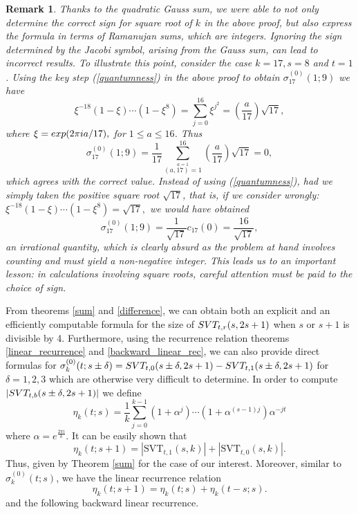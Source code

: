 \documentclass[12pt]{article}
\newtheorem{rema}{Remark}[subsection]%
\begin{document}
\begin{rema}
Thanks to the quadratic Gauss sum, we were able to not only determine the correct sign for square root of $k$ in the above proof, but also express the formula in terms of Ramanujan sums, which are integers.  Ignoring the sign determined by the Jacobi symbol, arising from the Gauss sum, can lead to incorrect results. To illustrate this point, consider the case $k = 17, s = 8$ and $t=1$. Using the key step (\ref{quantumness}) in the above proof to obtain $\sigma_{17}^{(0)}(1;9)$ we have 
$$
\xi^{-18}(1-\xi)\cdots (1-\xi^{8})=\sum_{j=0}^{16} \xi^{j^2}=\left(\frac{a}{17}\right)\sqrt{17},
$$
where $\xi=\textnormal{exp}(2\pi i a /17),$ for $1\leq a\leq 16$. Thus  
$$
\sigma_{17}^{(0)}(1;9)=\frac{1}{17}\sum_{\stackrel{a=1}{(a,17)=1}}^{16} \left(\frac{a}{17}\right)\sqrt{17}=0,
$$
which agrees with the correct value. Instead of using (\ref{quantumness}), had we simply taken the positive square root $\sqrt{17}$, that is, if we consider wrongly: $
\xi^{-18}(1-\xi)\cdots (1-\xi^{8})=\sqrt{17},
$
we would have obtained
\begin{equation}
\sigma_{17}^{(0)}(1; 9) = \frac{1}{\sqrt{17}} c_{17}(0)=\frac{16}{\sqrt{17}},
\end{equation}
an irrational quantity, which is clearly absurd as the problem at hand involves counting and must yield a non-negative integer. This leads us to an important lesson: in calculations involving square roots, careful attention must be paid to the choice of sign.
\end{rema}



From theorems \ref{sum} and \ref{difference}, we can obtain both an explicit and an efficiently computable formula for the size of \( \textnormal{SVT}_{t,r}(s, 2s+1) \) when \( s \) or $s+1$ is divisible by 4. Furthermore, using the recurrence relation theorems \ref{linear_recurrence} and \ref{backward_linear_rec}, we can also provide direct formulas for \( \sigma^{(0)}_{k}(t;s\pm\delta)=\textnormal{SVT}_{t,0}(s\pm\delta, 2s+1)-\textnormal{SVT}_{t,1}(s\pm\delta, 2s+1) \) for $\delta=1,2,3$ which are otherwise very difficult to determine. In order to compute $|\textnormal{SVT}_{t,b}(s\pm\delta, 2s+1)|$ we define 
$$
\eta_{k}(t;s)=\frac{1}{k}\sum_{j=0}^{k-1}(1+\alpha^{j})\cdots (1+\alpha^{(s-1)j})\alpha^{-jt}
$$
where $\alpha = e^{\frac{2\pi i}{k}}$. It can be easily shown that 
$$
\eta_{k}(t;s+1)=|\text{SVT}_{t,1}(s,k)|+|\text{SVT}_{t,0}(s,k)|.
$$
Thus, given by Theorem \ref{sum} for the case of our interest. Moreover, similar to $\sigma_{k}^{(0)}(t;s)$, we have the linear recurrence relation
$$
\eta_{k}(t;s+1)=\eta_{k}(t;s)+\eta_{k}(t-s;s).
$$
and the following backward linear recurrence. 
\end{document}
